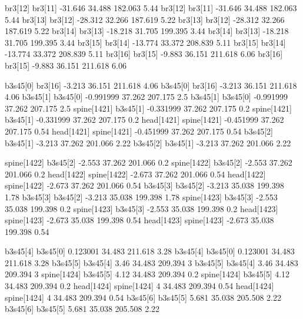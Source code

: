 br3[12]    br3[11]    -31.646    34.488    182.063    5.44
br3[12]    br3[11]    -31.646    34.488    182.063    5.44
br3[13]    br3[12]    -28.312    32.266    187.619    5.22
br3[13]    br3[12]    -28.312    32.266    187.619    5.22
br3[14]    br3[13]    -18.218    31.705    199.395    3.44
br3[14]    br3[13]    -18.218    31.705    199.395    3.44
br3[15]    br3[14]    -13.774    33.372    208.839    5.11
br3[15]    br3[14]    -13.774    33.372    208.839    5.11
br3[16]    br3[15]    -9.883    36.151    211.618    6.06
br3[16]    br3[15]    -9.883    36.151    211.618    6.06


b3s45[0]    br3[16]    -3.213    36.151    211.618    4.06
b3s45[0]    br3[16]    -3.213    36.151    211.618    4.06
b3s45[1]    b3s45[0]    -0.991999    37.262    207.175    2.5
b3s45[1]    b3s45[0]    -0.991999    37.262    207.175    2.5
spine[1421]    b3s45[1]    -0.331999    37.262    207.175    0.2
spine[1421]    b3s45[1]    -0.331999    37.262    207.175    0.2
head[1421]    spine[1421]    -0.451999    37.262    207.175    0.54
head[1421]    spine[1421]    -0.451999    37.262    207.175    0.54
b3s45[2]    b3s45[1]    -3.213    37.262    201.066    2.22
b3s45[2]    b3s45[1]    -3.213    37.262    201.066    2.22


spine[1422]    b3s45[2]    -2.553    37.262    201.066    0.2
spine[1422]    b3s45[2]    -2.553    37.262    201.066    0.2
head[1422]    spine[1422]    -2.673    37.262    201.066    0.54
head[1422]    spine[1422]    -2.673    37.262    201.066    0.54
b3s45[3]    b3s45[2]    -3.213    35.038    199.398    1.78
b3s45[3]    b3s45[2]    -3.213    35.038    199.398    1.78
spine[1423]    b3s45[3]    -2.553    35.038    199.398    0.2
spine[1423]    b3s45[3]    -2.553    35.038    199.398    0.2
head[1423]    spine[1423]    -2.673    35.038    199.398    0.54
head[1423]    spine[1423]    -2.673    35.038    199.398    0.54


b3s45[4]    b3s45[0]    0.123001    34.483    211.618    3.28
b3s45[4]    b3s45[0]    0.123001    34.483    211.618    3.28
b3s45[5]    b3s45[4]    3.46    34.483    209.394    3
b3s45[5]    b3s45[4]    3.46    34.483    209.394    3
spine[1424]    b3s45[5]    4.12    34.483    209.394    0.2
spine[1424]    b3s45[5]    4.12    34.483    209.394    0.2
head[1424]    spine[1424]    4    34.483    209.394    0.54
head[1424]    spine[1424]    4    34.483    209.394    0.54
b3s45[6]    b3s45[5]    5.681    35.038    205.508    2.22
b3s45[6]    b3s45[5]    5.681    35.038    205.508    2.22


